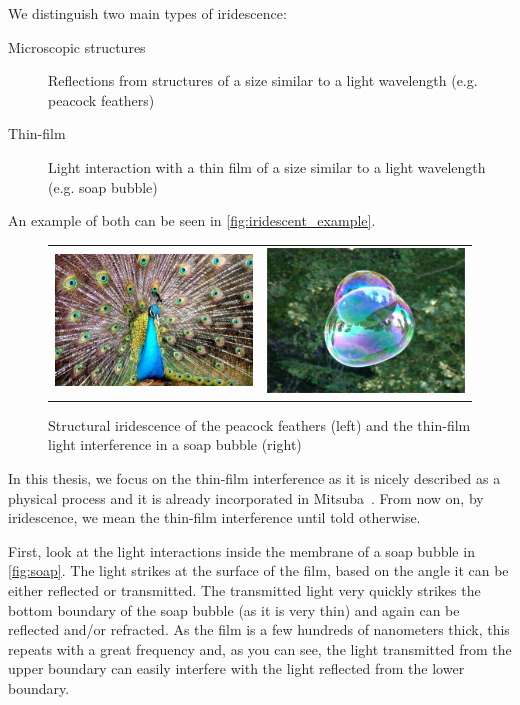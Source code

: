 We distinguish two main types of iridescence:

\begin{description}
	\item[Microscopic structures] Reflections from structures of a size similar to a light wavelength (e.g. peacock feathers)
	\item[Thin-film] Light interaction with a thin film of a size similar to a light wavelength (e.g. soap bubble)
\end{description}

An example of both can be seen in \autoref{fig:iridescent_example}.

\begin{figure}
	\centering
	\begin{tabular}{cc}
		\includegraphics[width=0.4\linewidth]{img/iridescent_peacock.jpg}
		&
		\includegraphics[width=0.4\linewidth]{img/iridescent_soap.jpg}
	\end{tabular}
	\caption[Irid example]{Structural iridescence of the peacock feathers (left) and the thin-film light interference in a soap bubble (right)\footnotemark}
	\label{fig:iridescent_example}
\end{figure}

In this thesis, we focus on the thin-film interference as it is nicely described as a physical process and it is already incorporated in Mitsuba~\cite{belcour2017practical}. From now on, by iridescence, we mean the thin-film interference until told otherwise.

First, look at the light interactions inside the membrane of a soap bubble in \autoref{fig:soap}. The light strikes at the surface of the film, based on the angle it can be either reflected or transmitted. The transmitted light very quickly strikes the bottom boundary of the soap bubble (as it is very thin) and again can be reflected and/or refracted. As the film is a few hundreds of nanometers thick, this repeats with a great frequency and, as you can see, the light transmitted from the upper boundary can easily interfere with the light reflected from the lower boundary.

